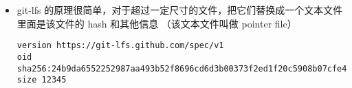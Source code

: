 
\begin{issues}
\issueDraft
\end{issues}

\begin{itemize}
\item git-lfs 的原理很简单，对于超过一定尺寸的文件，把它们替换成一个文本文件里面是该文件的 hash 和其他信息 （该文本文件叫做 pointer file）
\begin{lstlisting}[language=none]
version https://git-lfs.github.com/spec/v1
oid sha256:24b9da6552252987aa493b52f8696cd6d3b00373f2ed1f20c5908b07cfe4f2c0
size 12345
\end{lstlisting}
\end{itemize}
